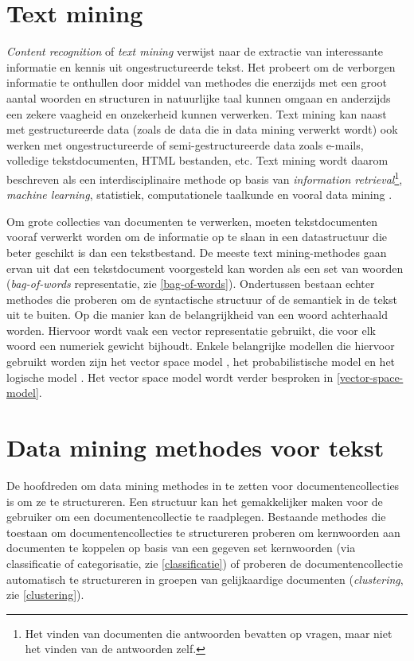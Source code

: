 \section{Text mining}\label{text-mining}
\textit{Content recognition} of \textit{text mining} verwijst naar de extractie van interessante informatie en kennis uit ongestructureerde tekst. Het probeert om de verborgen informatie te onthullen door middel van methodes die enerzijds met een groot aantal woorden en structuren in natuurlijke taal kunnen omgaan en anderzijds een zekere vaagheid en onzekerheid kunnen verwerken. Text mining kan naast met gestructureerde data (zoals de data die in data mining verwerkt wordt) ook werken met ongestructureerde of semi-gestructureerde data zoals e-mails, volledige tekstdocumenten, HTML bestanden, etc. Text mining wordt daarom beschreven als een interdisciplinaire methode op basis van \textit{information retrieval}\footnote{Het vinden van documenten die antwoorden bevatten op vragen, maar niet het vinden van de antwoorden zelf.},\textit{ machine learning}, statistiek, computationele taalkunde en vooral data mining  \cite{Hotho2005}. 

Om grote collecties van documenten te verwerken, moeten tekstdocumenten vooraf verwerkt worden om de informatie op te slaan in een datastructuur die beter geschikt is dan een tekstbestand. De meeste text mining-methodes gaan ervan uit dat een tekstdocument voorgesteld kan worden als een set van woorden (\textit{bag-of-words} representatie, zie \ref{bag-of-words}). Ondertussen bestaan echter methodes die proberen om de syntactische structuur of de semantiek in de tekst uit te buiten. Op die manier kan de belangrijkheid van een woord achterhaald worden. Hiervoor wordt vaak een vector representatie gebruikt, die voor elk woord een numeriek gewicht bijhoudt. Enkele belangrijke modellen die hiervoor gebruikt worden zijn het vector space model \cite{Salton1975}, het probabilistische model \cite{ROBERTSON1977} en het logische model \cite{Rigsbergen1986}. Het vector space model wordt verder besproken in \ref{vector-space-model}.





\section{Data mining methodes voor tekst}
De hoofdreden om data mining methodes in te zetten voor documentencollecties is om ze te structureren. Een structuur kan het gemakkelijker maken voor de gebruiker om een documentencollectie te raadplegen. Bestaande methodes die toestaan om documentencollecties te structureren proberen om kernwoorden aan documenten te koppelen op basis van een gegeven set kernwoorden (via classificatie of categorisatie, zie \ref{classificatie}) of proberen de documentencollectie automatisch te structureren in groepen van gelijkaardige documenten (\textit{clustering}, zie \ref{clustering}).


